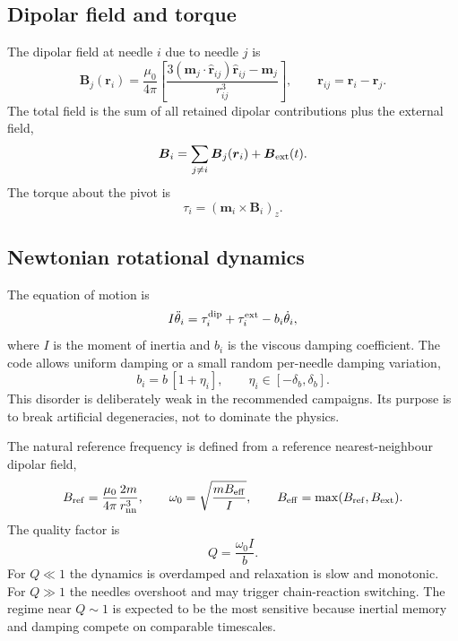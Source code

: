 \documentclass[11pt,a4paper]{article}
\newcommand{\vect}[1]{\boldsymbol{#1}}
\begin{document}
\subsection{Dipolar field and torque}

The dipolar field at needle $i$ due to needle $j$ is
\begin{equation}
\vect B_j(\vect r_i)=\frac{\mu_0}{4\pi}\left[
\frac{3(\vect m_j\cdot \hat{\vect r}_{ij})\hat{\vect r}_{ij}-\vect m_j}{r_{ij}^3}
\right],
\qquad
\vect r_{ij}=\vect r_i-\vect r_j.
\end{equation}
The total field is the sum of all retained dipolar contributions plus the external field,
\begin{equation}
\vect B_i=\sum_{j\ne i}\vect B_j(\vect r_i)+\vect B_{\rm ext}(t).
\end{equation}
The torque about the pivot is
\begin{equation}
\tau_i = (\vect m_i\times \vect B_i)_z.
\end{equation}

\subsection{Newtonian rotational dynamics}

The equation of motion is
\begin{equation}
I\ddot\theta_i = \tau_i^{\rm dip}+\tau_i^{\rm ext}-b_i\dot\theta_i,
\label{eq:eom}
\end{equation}
where $I$ is the moment of inertia and $b_i$ is the viscous damping coefficient. The code allows uniform damping or a small random per-needle damping variation,
\begin{equation}
b_i=b\,[1+\eta_i], \qquad \eta_i\in[-\delta_b,\delta_b].
\end{equation}
This disorder is deliberately weak in the recommended campaigns. Its purpose is to break artificial degeneracies, not to dominate the physics.

The natural reference frequency is defined from a reference nearest-neighbour dipolar field,
\begin{equation}
B_{\rm ref}=\frac{\mu_0}{4\pi}\frac{2m}{r_{\rm nn}^3},
\qquad
\omega_0=\sqrt{\frac{mB_{\rm eff}}{I}},
\qquad
B_{\rm eff}=\max(B_{\rm ref},B_{\rm ext}).
\end{equation}
The quality factor is
\begin{equation}
Q=\frac{\omega_0 I}{b}.
\end{equation}
For $Q\ll 1$ the dynamics is overdamped and relaxation is slow and monotonic. For $Q\gg1$ the needles overshoot and may trigger chain-reaction switching. The regime near $Q\sim 1$ is expected to be the most sensitive because inertial memory and damping compete on comparable timescales.
\end{document}
